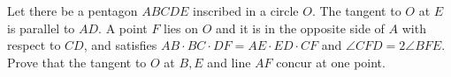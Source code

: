 Let there be a pentagon $ABCDE$ inscribed in a circle $O$. The tangent to $O$ at $E$ is parallel to $AD$. A point $F$ lies on $O$ and it is in the opposite side of $A$ with respect to $CD$, and satisfies $AB \cdot BC \cdot  DF = AE \cdot  ED \cdot  CF$ and $\angle CFD = 2\angle BFE$. Prove that the tangent to $O$ at $B,E$ and line $AF$ concur at one point.